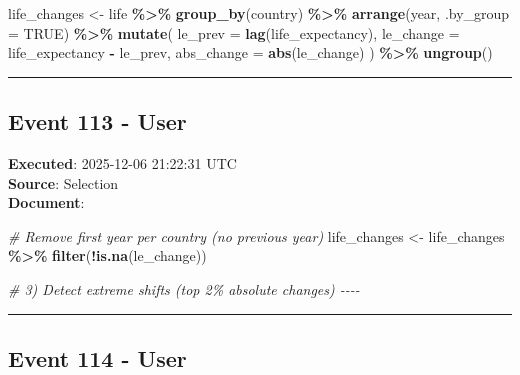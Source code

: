 \documentclass[
  11pt,
]{article}
\newenvironment{Shaded}{\begin{snugshade}}{\end{snugshade}}
\newcommand{\AttributeTok}[1]{\textcolor[rgb]{0.13,0.29,0.53}{#1}}
\newcommand{\CommentTok}[1]{\textcolor[rgb]{0.56,0.35,0.01}{\textit{#1}}}
\newcommand{\ConstantTok}[1]{\textcolor[rgb]{0.56,0.35,0.01}{#1}}
\newcommand{\FunctionTok}[1]{\textcolor[rgb]{0.13,0.29,0.53}{\textbf{#1}}}
\newcommand{\NormalTok}[1]{#1}
\newcommand{\OtherTok}[1]{\textcolor[rgb]{0.56,0.35,0.01}{#1}}
\newcommand{\SpecialCharTok}[1]{\textcolor[rgb]{0.81,0.36,0.00}{\textbf{#1}}}
\begin{document}
\begin{Shaded}
\begin{Highlighting}[]
\NormalTok{life\_changes }\OtherTok{\textless{}{-}}\NormalTok{ life }\SpecialCharTok{\%\textgreater{}\%}
  \FunctionTok{group\_by}\NormalTok{(country) }\SpecialCharTok{\%\textgreater{}\%}
  \FunctionTok{arrange}\NormalTok{(year, }\AttributeTok{.by\_group =} \ConstantTok{TRUE}\NormalTok{) }\SpecialCharTok{\%\textgreater{}\%}
  \FunctionTok{mutate}\NormalTok{(}
    \AttributeTok{le\_prev =} \FunctionTok{lag}\NormalTok{(life\_expectancy),}
    \AttributeTok{le\_change =}\NormalTok{ life\_expectancy }\SpecialCharTok{{-}}\NormalTok{ le\_prev,}
    \AttributeTok{abs\_change =} \FunctionTok{abs}\NormalTok{(le\_change)}
\NormalTok{  ) }\SpecialCharTok{\%\textgreater{}\%}
  \FunctionTok{ungroup}\NormalTok{()}
\end{Highlighting}
\end{Shaded}

\begin{center}\rule{0.5\linewidth}{0.5pt}\end{center}

\subsection{Event 113 - User}\label{event-113---user}

\textbf{Executed}: 2025-12-06 21:22:31 UTC\\
\textbf{Source}: Selection\\
\textbf{Document}:

\begin{Shaded}
\begin{Highlighting}[]
\CommentTok{\# Remove first year per country (no previous year)}
\NormalTok{life\_changes }\OtherTok{\textless{}{-}}\NormalTok{ life\_changes }\SpecialCharTok{\%\textgreater{}\%}
  \FunctionTok{filter}\NormalTok{(}\SpecialCharTok{!}\FunctionTok{is.na}\NormalTok{(le\_change))}

\CommentTok{\# 3) Detect extreme shifts (top 2\% absolute changes) {-}{-}{-}{-}}
\end{Highlighting}
\end{Shaded}

\begin{center}\rule{0.5\linewidth}{0.5pt}\end{center}

\subsection{Event 114 - User}\label{event-114---user}
\end{document}
